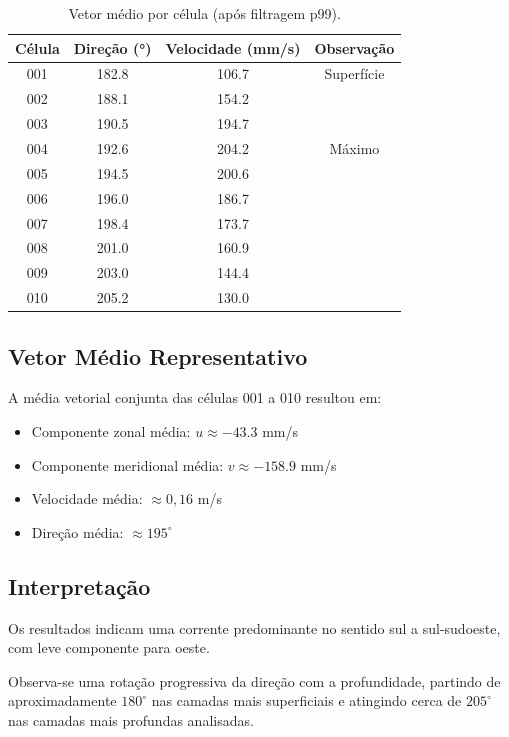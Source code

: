 \documentclass[a4paper,12pt]{article}
\begin{document}
\begin{table}[H]
\centering
\begin{tabular}{cccc}
\toprule
Célula & Direção (°) & Velocidade (mm/s) & Observação \\
\midrule
001 & 182.8 & 106.7 & Superfície \\
002 & 188.1 & 154.2 &  \\
003 & 190.5 & 194.7 &  \\
004 & 192.6 & 204.2 & Máximo \\
005 & 194.5 & 200.6 &  \\
006 & 196.0 & 186.7 &  \\
007 & 198.4 & 173.7 &  \\
008 & 201.0 & 160.9 &  \\
009 & 203.0 & 144.4 &  \\
010 & 205.2 & 130.0 &  \\
\bottomrule
\end{tabular}
\caption{Vetor médio por célula (após filtragem p99).}
\end{table}

\subsection{Vetor Médio Representativo}

A média vetorial conjunta das células 001 a 010 resultou em:

\begin{itemize}
    \item Componente zonal média: $u \approx -43.3$ mm/s
    \item Componente meridional média: $v \approx -158.9$ mm/s
    \item Velocidade média: $\approx 0{,}16$ m/s
    \item Direção média: $\approx 195^\circ$
\end{itemize}

\subsection{Interpretação}

Os resultados indicam uma corrente predominante no sentido sul a sul-sudoeste, com leve componente para oeste.

Observa-se uma rotação progressiva da direção com a profundidade, partindo de aproximadamente $180^\circ$ nas camadas mais superficiais e atingindo cerca de $205^\circ$ nas camadas mais profundas analisadas.
\end{document}
